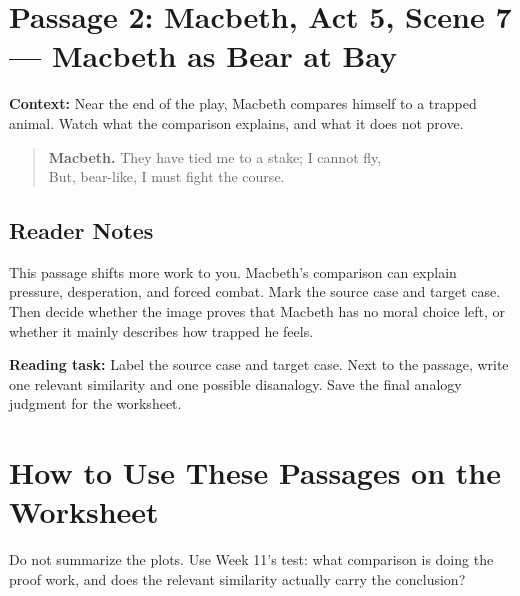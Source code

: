 \documentclass[12pt]{article}
\newenvironment{playpassage}{\begin{quote}\footnotesize\setlength{\parskip}{0.08em}\setlength{\parindent}{0pt}}{\end{quote}}
\newcommand{\speaker}[1]{\textbf{#1.}}
\begin{document}
\newpage

\section*{Passage 2: Macbeth, Act 5, Scene 7 --- Macbeth as Bear at Bay}

\textbf{Context:} Near the end of the play, Macbeth compares himself to a trapped animal. Watch what the comparison explains, and what it does not prove.

\begin{playpassage}
\speaker{Macbeth} They have tied me to a stake; I cannot fly,\\
But, bear-like, I must fight the course.
\end{playpassage}

\subsection*{Reader Notes}

This passage shifts more work to you. Macbeth's comparison can explain pressure, desperation, and forced combat. Mark the source case and target case. Then decide whether the image proves that Macbeth has no moral choice left, or whether it mainly describes how trapped he feels.

\textbf{Reading task:} Label the source case and target case. Next to the passage, write one relevant similarity and one possible disanalogy. Save the final analogy judgment for the worksheet.

\section*{How to Use These Passages on the Worksheet}

Do not summarize the plots. Use Week 11's test: what comparison is doing the proof work, and does the relevant similarity actually carry the conclusion?
\end{document}
